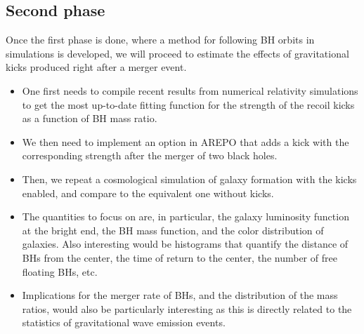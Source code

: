 \documentclass[a4,useAMS,usenatbib,usegraphicx,12pt]{article}
\begin{document}
\subsection*{Second phase}

Once the first phase is done, where a method for following BH orbits in simulations
is developed, we will proceed to estimate the effects of gravitational kicks 
produced right after a merger event.

\begin{itemize}

\item One first needs to compile recent results from numerical relativity 
simulations to get the most up-to-date fitting function for the strength of the 
recoil kicks as a function of BH mass ratio.
\item We then need to implement an option in AREPO that adds a kick with the
corresponding strength after the merger of two black holes.
\item Then, we repeat a cosmological simulation of galaxy formation with the 
kicks enabled, and compare to the equivalent one without kicks.
\item The quantities to focus on are, in particular, the galaxy luminosity 
function at the bright end, the BH mass function, and the color distribution of 
galaxies. Also interesting would be histograms that quantify the distance of BHs 
from the center, the time of return to the center, the number of free floating 
BHs, etc.
\item Implications for the merger rate of BHs, and the distribution of the mass 
ratios, would also be particularly interesting as this is directly related to 
the statistics of gravitational wave emission events.

\end{itemize}

\newpage

\renewcommand{\bibname}{8\ \ \ \ Bibliography}
\small



\newpage

\end{document}
